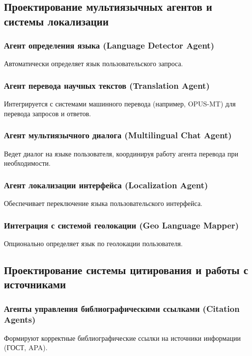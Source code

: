 \documentclass[a4paper,14pt]{extarticle}
\begin{document}
	\subsection{Проектирование мультиязычных агентов и системы локализации}
	
	\subsubsection{Агент определения языка (Language Detector Agent)}
	Автоматически определяет язык пользовательского запроса.
	
	\subsubsection{Агент перевода научных текстов (Translation Agent)}
	Интегрируется с системами машинного перевода (например, OPUS-MT) для перевода запросов и ответов.
	
	\subsubsection{Агент мультиязычного диалога (Multilingual Chat Agent)}
	Ведет диалог на языке пользователя, координируя работу агента перевода при необходимости.
	
	\subsubsection{Агент локализации интерфейса (Localization Agent)}
	Обеспечивает переключение языка пользовательского интерфейса.
	
	\subsubsection{Интеграция с системой геолокации (Geo Language Mapper)}
	Опционально определяет язык по геолокации пользователя.
	
	\subsection{Проектирование системы цитирования и работы с источниками}
	
	\subsubsection{Агенты управления библиографическими ссылками (Citation Agents)}
	Формируют корректные библиографические ссылки на источники информации (ГОСТ, APA).
	
\end{document}
